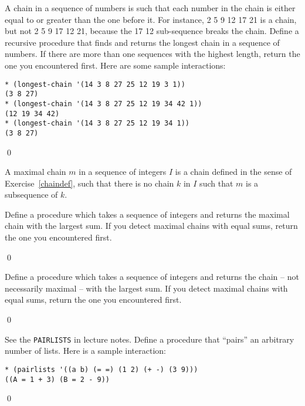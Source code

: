 \documentclass[a4paper,11pt]{article}
\begin{document}
\begin{uexercise}
		\label{chaindef}

A chain in a sequence of numbers is such that each number in the chain is either equal to or greater than the one before it. For instance, 2 5 9 12 17 21 is a chain, but not 2 5 9 17 12 21, because the 17 12 sub-sequence breaks the chain. Define a recursive procedure that finds and returns the longest chain in a sequence of numbers. If there are more than one sequences with the highest length, return the one you encountered first. Here are some sample interactions:

\begin{Verbatim}
* (longest-chain '(14 3 8 27 25 12 19 3 1))
(3 8 27)
* (longest-chain '(14 3 8 27 25 12 19 34 42 1))
(12 19 34 42)
* (longest-chain '(14 3 8 27 25 12 19 34 1))
(3 8 27)
\end{Verbatim}

\qed
\end{uexercise}

\begin{uexercise}[*]

A maximal chain $m$ in a sequence of integers $I$ is a chain defined
in the sense of Exercise~\ref{chaindef}, such that there is no chain
$k$ in $I$ such that $m$ is a subsequence of $k$. 

Define a procedure which takes a sequence of integers and returns the
maximal chain with the largest sum. If you detect maximal chains with
equal sums, return the one you encountered first.

\qed
\end{uexercise}

\begin{uexercise}[*]

Define a procedure which takes a sequence of integers and returns the
chain  -- not necessarily maximal -- with the largest sum. If you
detect maximal chains with equal sums, return the one you encountered
first.

\qed
\end{uexercise}

\begin{uexercise}
See the \Verb+PAIRLISTS+ in lecture notes. Define a procedure that ``pairs'' an arbitrary number of lists. Here is a sample interaction:

{\small
\begin{Verbatim}
* (pairlists '((a b) (= =) (1 2) (+ -) (3 9)))
((A = 1 + 3) (B = 2 - 9))
\end{Verbatim}
}

\qed
\end{uexercise}
\end{document}
